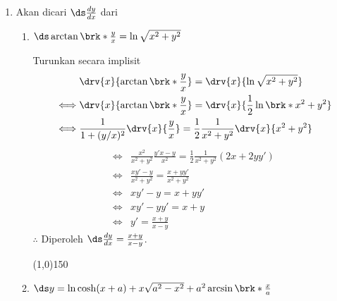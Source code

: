 \begin{enumerate}[leftmargin=*, label={\arabic*}.]
\item Akan dicari $\ds \frac{dy}{dx}$ dari 
\begin{enumerate}[label={\alph*}.]
    \item $\ds \arctan\brk*{\frac{y}{x}}=\ln\sqrt{x^{2}+y^{2}}$
    
    Turunkan secara implisit
    \begin{align*}
        &\drv{x}{\arctan\brk*{\frac{y}{x}}} = \drv{x}{\ln\sqrt{x^{2}+y^{2}}}\\
        \iff &\drv{x}{\arctan\brk*{\frac{y}{x}}} 
        = \drv{x}{\frac{1}{2}\ln\brk*{x^{2}+y^{2}}}\\
        \iff &\frac{1}{1+(y/x)^{2}}\drv{x}{\frac{y}{x}} 
        = \frac{1}{2}\frac{1}{x^{2}+y^{2}}\drv{x}{x^{2}+y^{2}}\\
    \end{align*}
    \begin{align*}
        \iff &\frac{x^{2}}{x^{2}+y^{2}}\frac{y'x-y}{x^{2}} 
        = \frac{1}{2}\frac{1}{x^{2}+y^{2}}(2x+2yy')\\
        \iff &\frac{xy'-y}{x^{2}+y^{2}} = \frac{x+yy'}{x^{2}+y^{2}}\\
        \iff &xy'-y= x+yy'\\
        \iff &xy'-yy'= x+y\\
        \iff &y' = \frac{x+y}{x-y}
    \end{align*}
    $\therefore$ Diperoleh $\ds \frac{dy}{dx} = \frac{x+y}{x-y}$.
\begin{center}
    \line(1,0){150}
\end{center}
    \item $\ds y=\ln \cosh (x+a)+x\sqrt{a^{2}-x^{2}}+a^{2}\arcsin\brk*{\frac{x}{a}}$
    

\end{enumerate}
\end{enumerate}
